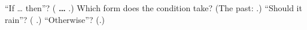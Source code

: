 \begin{tcolorbox}[breakable,colback=teal!4,colframe=teal!35!black,title={Before you move on}]
\textquotedblleft{}If … then\textquotedblright{}? (\textbf{ … }.) Which form does the condition take? (The past: \textbf{}.) \textquotedblleft{}Should it rain\textquotedblright{}? (\textbf{ }.) \textquotedblleft{}Otherwise\textquotedblright{}? (\textbf{}.)
\end{tcolorbox}
